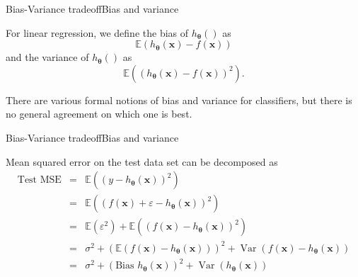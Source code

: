\documentclass{beamer}
\renewcommand{\vec}[1]{\boldsymbol{#1}}
\def\Expec{\mathbb{E}}
\DeclareMathOperator*{\var}{Var}
\begin{document}
\begin{frame}{Bias-Variance tradeoff}{Bias and variance}

  For linear regression, we define the \alert{bias} of
  $h_{\vec{\theta}}()$ as
  \[ \Expec(h_{\vec{\theta}}(\vec{x})-f(\vec{x})) \]
  and the \alert{variance} of $h_{\vec{\theta}}()$ as
  \[ \Expec \left( (h_{\vec{\theta}}(\vec{x}) - f(\vec{x}))^2 \right). \]

  \medskip

  There are various formal notions of bias and variance for
  classifiers, but there is no general agreement on which one is best.

\end{frame}


\begin{frame}{Bias-Variance tradeoff}{Bias and variance}

  Mean squared error on the test data set can be decomposed as
  \begin{eqnarray}
    \text {Test MSE} & = & \Expec\left( (y - h_{\vec{\theta}}(\vec{x}))^2 \right) \nonumber \\
    & = & \Expec\left( (
    f(\vec{x}) + \varepsilon - h_{\vec{\theta}}(\vec{x})
    )^2 \right) \nonumber \\
    & = & \Expec (\varepsilon^2) + \Expec\left( (f(\vec{x}) - h_{\vec{\theta}}(\vec{x}))^2 \right) \label{squared-sum-eq} \\
    & = & \sigma^2 + \left(\Expec(f(\vec{x})-h_{\vec{\theta}}(\vec{x}))\right)^2
    + \var\left(f(\vec{x})-h_{\vec{\theta}}(\vec{x})\right) \label{squared-eq} \\
    & = & \sigma^2 + \left(\text{Bias } h_{\vec{\theta}}(\vec{x})\right)^2 +
    \var\left( h_{\vec{\theta}}(\vec{x}) \right) \nonumber
  \end{eqnarray}

\end{frame}
\end{document}
